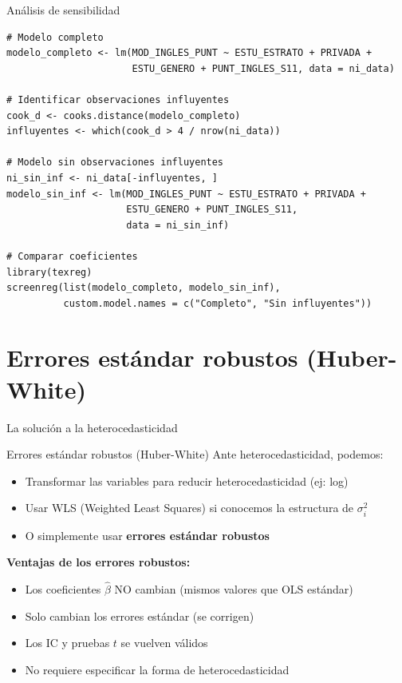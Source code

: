 \documentclass[aspectratio=169, 11pt]{beamer}
\begin{document}
\begin{frame}[fragile]{Análisis de sensibilidad}
\small
\begin{lstlisting}
# Modelo completo
modelo_completo <- lm(MOD_INGLES_PUNT ~ ESTU_ESTRATO + PRIVADA +
                      ESTU_GENERO + PUNT_INGLES_S11, data = ni_data)

# Identificar observaciones influyentes
cook_d <- cooks.distance(modelo_completo)
influyentes <- which(cook_d > 4 / nrow(ni_data))

# Modelo sin observaciones influyentes
ni_sin_inf <- ni_data[-influyentes, ]
modelo_sin_inf <- lm(MOD_INGLES_PUNT ~ ESTU_ESTRATO + PRIVADA +
                     ESTU_GENERO + PUNT_INGLES_S11,
                     data = ni_sin_inf)

# Comparar coeficientes
library(texreg)
screenreg(list(modelo_completo, modelo_sin_inf),
          custom.model.names = c("Completo", "Sin influyentes"))
\end{lstlisting}
\end{frame}

\section{Errores est\'andar robustos (Huber-White)}

\begin{frame}{La soluci\'on a la heterocedasticidad}
\begin{block}{Errores est\'andar robustos (Huber-White)}
Ante heterocedasticidad, podemos:
\begin{itemize}
\item Transformar las variables para reducir heterocedasticidad (ej: log)
\item Usar WLS (Weighted Least Squares) si conocemos la estructura de $\sigma_i^2$
\item O simplemente usar \textbf{errores est\'andar robustos}
\end{itemize}
\end{block}

\textbf{Ventajas de los errores robustos:}
\begin{itemize}
\item Los coeficientes $\hat{\beta}$ NO cambian (mismos valores que OLS est\'andar)
\item Solo cambian los errores est\'andar (se corrigen)
\item Los IC y pruebas $t$ se vuelven v\'alidos
\item No requiere especificar la forma de heterocedasticidad
\end{itemize}
\end{frame}
\end{document}
